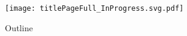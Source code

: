 \newcommand\blfootnote[1]{%
  \begingroup
  \renewcommand\thefootnote{}\footnote{{\tiny #1 }}%
  \addtocounter{footnote}{-1}%
  \endgroup
}

%	

\begin{frame}
\texttt{[image: titlePageFull\_InProgress.svg.pdf]}
\end{frame}
\begin{frame}	{Outline}
	\tableofcontents
\end{frame}

